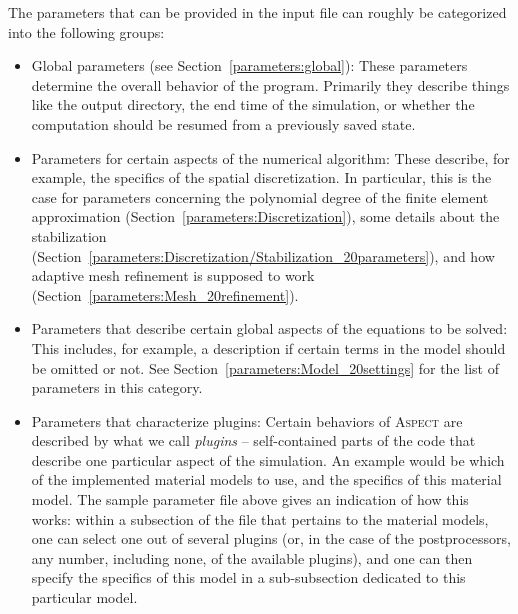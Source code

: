 \documentclass{article}
\newcommand{\aspect}{\textsc{Aspect}}
\begin{document}
The parameters that can be provided in the input file can roughly be
categorized into the following groups:
\begin{itemize}
\item Global parameters (see Section~\ref{parameters:global}): These
  parameters determine the overall behavior of the program. Primarily they
  describe things like the output directory, the end time of the simulation,
  or whether the computation should be resumed from a previously saved state.

\item Parameters for certain aspects of the numerical algorithm: These
  describe, for example, the specifics of the spatial discretization. In
  particular, this is the case for parameters concerning
  the polynomial degree of the finite element approximation
  (Section~\ref{parameters:Discretization}), some details about the
  stabilization
  (Section~\ref{parameters:Discretization/Stabilization_20parameters}), and
  how adaptive mesh refinement is supposed to work
  (Section~\ref{parameters:Mesh_20refinement}).

\item Parameters that describe certain global aspects of the equations to be
  solved: This includes, for example, a description if certain terms in the
  model should be omitted or not. See
  Section~\ref{parameters:Model_20settings} for the list of parameters in this
  category.

\item Parameters that characterize plugins: Certain behaviors of
  \aspect{} are described by what we call \textit{plugins} -- self-contained
  parts of the code that describe one particular aspect of the simulation. An
  example would be which of the implemented material models to use, and the
  specifics of this material model. The sample parameter file above gives an
  indication of how this works: within a subsection of the file that pertains
  to the material models, one can select one out of several plugins (or, in
  the case of the postprocessors, any number, including none, of the available
  plugins), and one can then specify the specifics of this model in a
  sub-subsection dedicated to this particular model.


\end{itemize}
\end{document}
